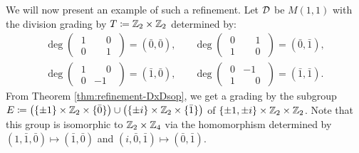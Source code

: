 We will now present an example of such a refinement. 
Let $\mathcal{D}$ be $M(1,1)$ with the division grading by $T \coloneqq \mathbb{Z}_2 \times \mathbb{Z}_2$ determined by:
\begin{align*}
    \deg \begin{pmatrix}
        \phantom{.}1 & \phantom{-}0\phantom{.}\\
        \phantom{.}0 & \phantom{-}1\phantom{.}
    \end{pmatrix} = (\bar 0, \bar 0),\quad & \deg \begin{pmatrix}
        \phantom{.}0 & \phantom{-}1\phantom{.} \\
        \phantom{.}1 & \phantom{-}0\phantom{.}
    \end{pmatrix} = (\bar 0, \bar 1),\\
    \deg \begin{pmatrix}
        \phantom{.}1 & \phantom{-}0\phantom{.}\\
        \phantom{.}0 & -1\phantom{.}
    \end{pmatrix} = (\bar 1, \bar 0),\quad &
    \deg \begin{pmatrix}
        \phantom{.}0 & -1\phantom{.} \\
        \phantom{.}1 & \phantom{-}0\phantom{.}
    \end{pmatrix} = (\bar 1, \bar 1).
\end{align*}
%
%
%
From Theorem \ref{thm:refinement-DxDsop}, we get a grading by the subgroup $E \coloneqq \big( \{ \pm 1 \} \times \mathbb{Z}_2 \times \{ \bar 0 \} \big) \cup \big( \{ \pm i \} \times \mathbb{Z}_2 \times \{ \bar 1 \} \big)$ of $\{\pm 1, \pm i\} \times \mathbb{Z}_2 \times \mathbb{Z}_2$. 
Note that this group is isomorphic to $\mathbb{Z}_2 \times \mathbb{Z}_4$ via the homomorphism determined by $(1, \bar 1, \bar 0) \mapsto (\bar 1, \bar 0)$ and $(i, \bar 0, \bar 1) \mapsto (\bar 0, \bar 1)$. 

